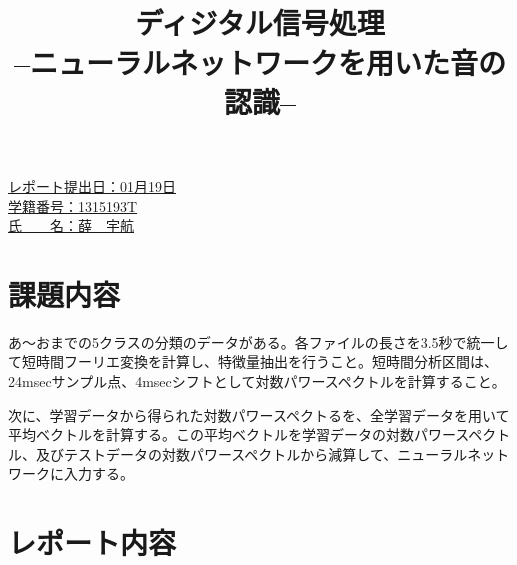 \documentclass[a4j,12]{jarticle}
\def\group{グループ番号}
\def\idnumber{1315193T}
\def\name{薛　宇航}
\def\expmontho{月}
\def\expdayo{日}
\def\expmontht{月}
\def\expdayt{日}
\def\expmonthth{月}
\def\expdayth{日}
\def\deadlinem{01}
\def\deadlined{19}
\begin{document}
\title{
\vspace{1cm}{\LARGE 平成27年度}\\
\begin{spacing}{1.5}
{\Huge ディジタル信号処理}\\
{\huge --ニューラルネットワークを用いた音の認識--}
\end{spacing}
\author{}
\date{}
}%
\maketitle
\vspace{5cm}
{\Large
\begin{spacing}{1.2}
\hspace{20em}\underline{レポート提出日：\deadlinem 月\deadlined 日}\\
\hspace{20em}\underline{学籍番号：\idnumber}\\
\hspace{20em}\underline{氏　　名：\name}\\
\end{spacing}
}
\thispagestyle{empty}
\newpage
\setcounter{page}{1}      %


\section{課題内容}
あ〜おまでの5クラスの分類のデータがある。各ファイルの長さを3.5秒で統一して短時間フーリエ変換を計算し、特徴量抽出を行うこと。短時間分析区間は、24msecサンプル点、4msecシフトとして対数パワースペクトルを計算すること。\par
次に、学習データから得られた対数パワースペクトるを、全学習データを用いて平均ベクトルを計算する。この平均ベクトルを学習データの対数パワースペクトル、及びテストデータの対数パワースペクトルから減算して、ニューラルネットワークに入力する。
\section{レポート内容}
\end{document}
